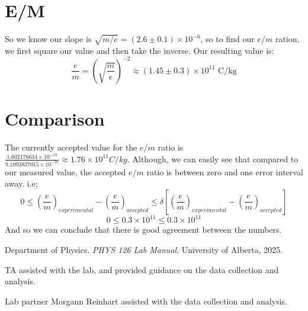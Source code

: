 \documentclass[12pt]{article}
\begin{document}
\section{E/M}
So we know our slope is $\sqrt{m/e} = (2.6 \pm 0.1) \times 10^{-6}$, so to find our $e/m$ ration,
we first square our value and then take the inverse. Our resulting value is:
\begin{equation*}
    \frac{e}{m} = \left(\sqrt{\frac{m}{e}}\right)^{-2}\approx (1.45 \pm 0.3) \times 10^{11} \text{ C/kg}
\end{equation*}
\section{Comparison}
The currently accepted value for the $e/m$ ratio is $\frac{1.602176634 \times 10^{-19}}{9.1093837015 \times 10^{-31}} \approx 1.76 \times 10^{11} C/kg$.
Although, we can easily see that compared to our measured value, the accepted $e/m$ ratio is between zero and one error interval away.
i.e;
\begin{equation*}
    0 \le \left(\frac{e}{m}\right)_{experimental} - \left(\frac{e}{m}\right)_{accepted} \le \delta\left[\left(\frac{e}{m}\right)_{experimental} - \left(\frac{e}{m}\right)_{accepted}\right]
\end{equation*} 
\begin{equation*}
    0 \le 0.3 \times 10^{11} \le 0.3 \times 10^{11}
\end{equation*}
And so we can conclude that there is good agreement between the numbers.
\renewcommand{\bibname}{5\ \ \References and Acknowledgements}
\begin{thebibliography}{9}
    Department of Physics. \textit{PHYS 126 Lab Manual}. University of Alberta, 2025.

    TA assisted with the lab, and provided guidance on the data collection and analysis.

    Lab partner Morgann Reinhart assisted with the data collection and analysis.
    
\end{thebibliography}
\end{document}
